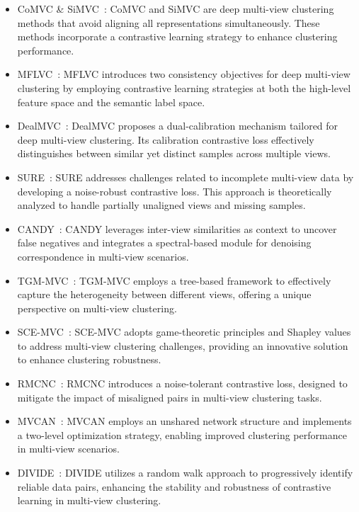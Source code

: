 \documentclass{article}
\theoremstyle{plain}
\theoremstyle{definition}
\theoremstyle{remark}
\begin{document}
\begin{itemize}

\item CoMVC \& SiMVC~\cite{SiMVC}: CoMVC and SiMVC are deep multi-view clustering methods that avoid aligning all representations simultaneously. These methods incorporate a contrastive learning strategy to enhance clustering performance.

\item MFLVC~\cite{MFLVC}: MFLVC introduces two consistency objectives for deep multi-view clustering by employing contrastive learning strategies at both the high-level feature space and the semantic label space.

\item DealMVC~\cite{DealMVC}: DealMVC proposes a dual-calibration mechanism tailored for deep multi-view clustering. Its calibration contrastive loss effectively distinguishes between similar yet distinct samples across multiple views.

\item SURE~\cite{SURE}: SURE addresses challenges related to incomplete multi-view data by developing a noise-robust contrastive loss. This approach is theoretically analyzed to handle partially unaligned views and missing samples.

\item CANDY~\cite{candy}: CANDY leverages inter-view similarities as context to uncover false negatives and integrates a spectral-based module for denoising correspondence in multi-view scenarios.

\item TGM-MVC~\cite{TGM-MVC}: TGM-MVC employs a tree-based framework to effectively capture the heterogeneity between different views, offering a unique perspective on multi-view clustering.

\item SCE-MVC~\cite{SCE-MVC}: SCE-MVC adopts game-theoretic principles and Shapley values to address multi-view clustering challenges, providing an innovative solution to enhance clustering robustness.

\item RMCNC~\cite{sun2024robust}: RMCNC introduces a noise-tolerant contrastive loss, designed to mitigate the impact of misaligned pairs in multi-view clustering tasks.

\item MVCAN~\cite{MVCAN}: MVCAN employs an unshared network structure and implements a two-level optimization strategy, enabling improved clustering performance in multi-view scenarios.

\item DIVIDE~\cite{DIVIDE}: DIVIDE utilizes a random walk approach to progressively identify reliable data pairs, enhancing the stability and robustness of contrastive learning in multi-view clustering.

    
\end{itemize}




\end{document}
